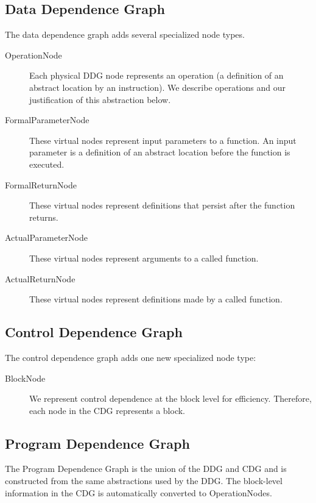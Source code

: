 \documentclass[12pt,titlepage]{article}
\begin{document}
\subsection{Data Dependence Graph}

The data dependence graph adds several specialized node types.

\begin{description}
\item[OperationNode] Each physical
DDG node represents an operation (a definition of an abstract location
by an instruction). We describe operations and our justification of
this abstraction below.  
\item[FormalParameterNode] These virtual nodes
represent input parameters to a function. An input parameter is a
definition of an abstract location before the function is executed.
\item[FormalReturnNode] These virtual nodes represent definitions that
persist after the function returns.  
\item[ActualParameterNode] These
virtual nodes represent arguments to a called function.
\item[ActualReturnNode] These virtual nodes represent definitions made by a
called function. 
\end{description}

\subsection{Control Dependence Graph}

The control dependence graph adds one new specialized node type:

\begin{description}
\item[BlockNode] We represent
control dependence at the block level for efficiency. Therefore, each
node in the CDG represents a block. 
\end{description}

\subsection{Program Dependence Graph}
The Program Dependence Graph is the union of the DDG and CDG and is
constructed from the same abstractions used by the DDG. The
block-level information in the CDG is automatically converted to
OperationNodes.
\end{document}
